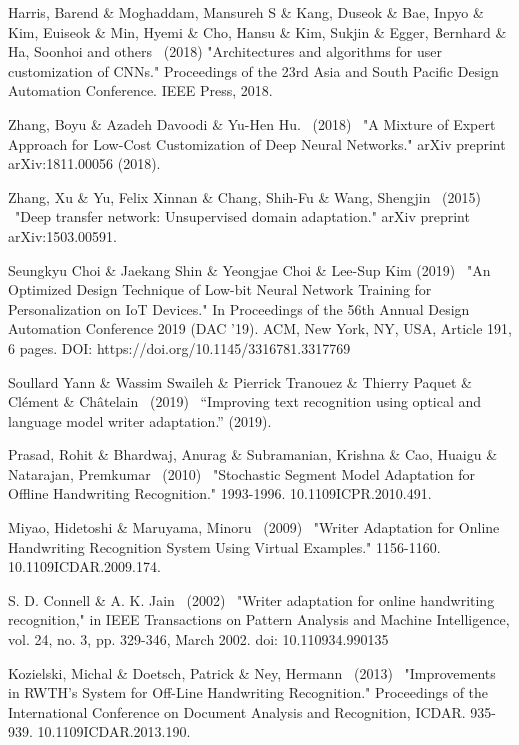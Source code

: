 \documentclass{article}
\begin{document}
\begin{thebibliography}{99}
   Harris, Barend \& Moghaddam, Mansureh S \& Kang, Duseok \& Bae, Inpyo \& Kim, Euiseok \& Min, Hyemi \& Cho, Hansu \& Kim, Sukjin \& Egger, Bernhard \& Ha, Soonhoi and others \ (2018) "Architectures and algorithms for user customization of CNNs." Proceedings of the 23rd Asia and South Pacific Design Automation Conference. IEEE Press, 2018.

   Zhang, Boyu \& Azadeh Davoodi \& Yu-Hen Hu. \ (2018) \ "A Mixture of Expert Approach for Low-Cost Customization of Deep Neural Networks." arXiv preprint arXiv:1811.00056 (2018).

   Zhang, Xu \& Yu, Felix Xinnan \& Chang, Shih-Fu \& Wang, Shengjin \ (2015) \ "Deep transfer network: Unsupervised domain adaptation." arXiv preprint arXiv:1503.00591.

   Seungkyu Choi \& Jaekang Shin \& Yeongjae Choi \& Lee-Sup Kim (2019) \ "An Optimized Design Technique of Low-bit Neural Network Training for Personalization on IoT Devices." In Proceedings of the 56th Annual Design Automation Conference 2019 (DAC '19). ACM, New York, NY, USA, Article 191, 6 pages. DOI: https://doi.org/10.1145/3316781.3317769

   Soullard Yann \& Wassim Swaileh \& Pierrick Tranouez \& Thierry Paquet \& Clément \& Châtelain \ (2019) \ “Improving text recognition using optical and language model writer adaptation.” (2019).

   Prasad, Rohit \& Bhardwaj, Anurag \& Subramanian, Krishna \& Cao, Huaigu \& Natarajan, Premkumar \ (2010) \ "Stochastic Segment Model Adaptation for Offline Handwriting Recognition." 1993-1996. 10.1109\/ICPR.2010.491. 

   Miyao, Hidetoshi \& Maruyama, Minoru \ (2009) \ "Writer Adaptation for Online Handwriting Recognition System Using Virtual Examples." 1156-1160. 10.1109\/ICDAR.2009.174. 

   S. D. Connell \&  A. K. Jain \ (2002) \ "Writer adaptation for online handwriting recognition," in IEEE Transactions on Pattern Analysis and Machine Intelligence, vol. 24, no. 3, pp. 329-346, March 2002. doi: 10.1109\/34.990135

   Kozielski, Michal \& Doetsch, Patrick \& Ney, Hermann \ (2013) \ "Improvements in RWTH's System for Off-Line Handwriting Recognition." Proceedings of the International Conference on Document Analysis and Recognition, ICDAR. 935-939. 10.1109\/ICDAR.2013.190. 


\end{thebibliography}
\end{document}
